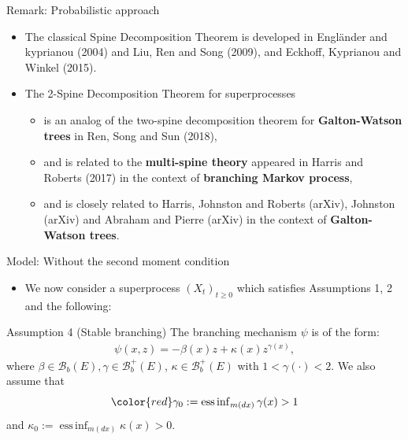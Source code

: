 \documentclass[xcolor=dvipsnames]{beamer}
\begin{document}
\begin{frame}{Remark: Probabilistic approach}
\begin{itemize}
\item
{\color{blue} The classical Spine Decomposition Theorem} is developed in Engl\"ander and kyprianou (2004) and Liu, Ren and Song (2009), and Eckhoff, Kyprianou and Winkel (2015).
\item
{\color{red} The 2-Spine Decomposition Theorem} for superprocesses 
\begin{itemize}
\item
is an analog of the two-spine decomposition theorem for \textbf{Galton-Watson trees} in Ren, Song and Sun (2018), 
\item
and is related to the \textbf{multi-spine theory} appeared in Harris and Roberts (2017) in the context of \textbf{branching Markov process}, 
\item
and is closely related to Harris, Johnston and Roberts (arXiv), Johnston (arXiv) and Abraham and Pierre (arXiv) in the context of \textbf{Galton-Watson trees}.
\end{itemize}
\end{itemize}
\end{frame}

\begin{frame}{Model: Without the second moment condition}
\begin{itemize}
\item We now consider a superprocess $(X_t)_{t\geq 0}$ which satisfies Assumptions 1, 2 and the following: 
\end{itemize}
\begin{block}{Assumption 4 (Stable branching)}
  The branching mechanism $\psi$ is of the form:
\begin{align*}
  \psi(x,z)
  = -\beta (x) z + \kappa(x) z^{\gamma(x)},
\end{align*}
  where $\beta \in \mathscr B_b(E), \gamma \in \mathscr B^+_b(E)$, $\kappa \in \mathscr B^+_b(E)$ with $1< \gamma(\cdot )<2$. 
We also assume that 
\[{\color{red} \gamma_0} := \operatorname{ess\,inf}_{m(dx)} \gamma(x)> 1\] and $\kappa_0:=\operatorname{ess\,inf}_{m(dx)}\kappa(x) > 0$.
\end{block}
\end{frame}
\end{document}
